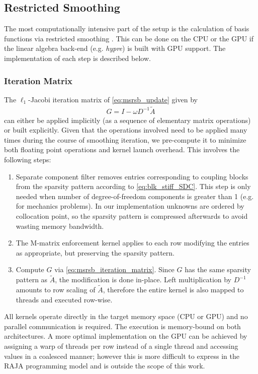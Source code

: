 \subsection{Restricted Smoothing}
\label{subsec:par_kernels_msrsb}

The most computationally intensive part of the setup is the calculation of basis functions via restricted smoothing .   This can be done on the CPU or the GPU if the linear algebra back-end (e.g. \textit{hypre}) is built with GPU support.   The implementation of each step is described below.

\subsubsection{Iteration Matrix}
\label{subsubsec:par_kernels_msrsb_matrix}

The $\ell_1$-Jacobi iteration matrix of \cref{eq:msrsb_update} given by 
\begin{align}
    G = I - \omega D^{-1} \widetilde{A} \label{eq:msrsb_iteration_matrix}
\end{align}
can either be applied implicitly (as a sequence of elementary matrix operations) or built explicitly.   Given that the operations involved need to be applied many times during the course of smoothing iteration, we pre-compute it to minimize both floating point operations and kernel launch overhead.   This involves the following steps:
\begin{enumerate}
    \item Separate component filter removes entries corresponding to coupling blocks from the sparsity pattern according to \cref{eq:blk_stiff_SDC}.   This step is only needed when number of degree-of-freedom components is greater than 1 (e.g. for mechanics problems).   In our implementation unknowns are ordered by collocation point, so the sparsity pattern is compressed afterwards to avoid wasting memory bandwidth.
    \item The M-matrix enforcement kernel applies  to each row modifying the entries as appropriate, but preserving the sparsity pattern.
    \item Compute $G$ via \cref{eq:msrsb_iteration_matrix}.   Since $G$ has the same sparsity pattern as $\widetilde{A}$, the modification is done in-place.   Left multiplication by $D^{-1}$ amounts to row scaling of $\widetilde{A}$, therefore the entire kernel is also mapped to threads and executed row-wise.
\end{enumerate}
All kernels operate directly in the target memory space (CPU or GPU) and no parallel communication is required.   The execution is memory-bound on both architectures.    A more optimal implementation on the GPU can be achieved by assigning a warp of threads per row instead of a single thread and accessing values in a coalesced manner; however this is more difficult to express in the RAJA programming model and is outside the scope of this work.

